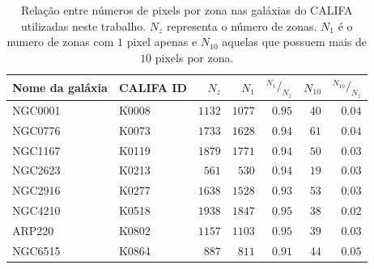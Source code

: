 \begin{table}
	\caption[Relação de pixels e zonas em algumas galáxias do CALIFA]
	{Relação entre números de pixels por zona nas galáxias do CALIFA utilizadas
	neste trabalho. $N_z$ representa o número de zonas. $N_1$ é o numero de zonas
	com $1$ pixel apenas e $N_{10}$ aquelas que possuem mais de $10$ pixels por
	zona.}
	\begin{tabular}{l l r r r r r}
		Nome da galáxia & CALIFA ID & $N_z$ & $N_{1}$ & ${}^{N_1}/_{N_z}$ & 
		$N_{10}$ & ${}^{N_{10}}/_{N_z}$ \\
		\midrule
		NGC0001 & K0008 & $1132$ & $1077$ & $0.95$ & $40$ & $0.04$ \\
		NGC0776 & K0073 & $1733$ & $1628$ & $0.94$ & $61$ & $0.04$ \\
		NGC1167 & K0119 & $1879$ & $1771$ & $0.94$ & $50$ & $0.03$ \\
		NGC2623 & K0213 & $561$ & $530$ & $0.94$ & $19$ & $0.03$ \\
		NGC2916 & K0277 & $1638$ & $1528$ & $0.93$ & $53$ & $0.03$ \\
		NGC4210 & K0518 & $1938$ & $1847$ & $0.95$ & $38$ & $0.02$ \\
		ARP220 & K0802 & $1157$ & $1103$ & $0.95$ & $39$ & $0.03$ \\
		NGC6515 & K0864 & $887$ & $811$ & $0.91$ & $44$ & $0.05$ \\
	\end{tabular}
	\label{tab:pixelZones}
\end{table}
